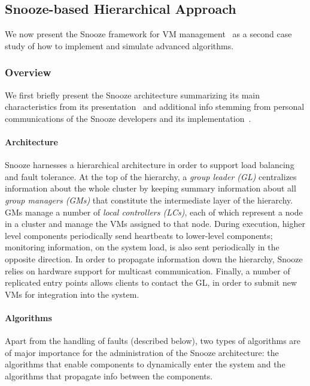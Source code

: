 \subsection{Snooze-based Hierarchical Approach}
\label{subsec:snooze}


We now present the Snooze framework for VM
management~\cite{feller:ccgrid12} as a second case study of how
to implement and simulate advanced algorithms.

\subsubsection{Overview}

We first briefly present the Snooze architecture summarizing its main
characteristics from its presentation~\cite{feller:ccgrid12} and
additional info stemming from personal communications of the Snooze
developers and its implementation~\cite{snoozedev14,snoozeweb}.

\paragraph{Architecture}

Snooze harnesses a hierarchical architecture in order to support load
balancing and fault tolerance. At the top of the hierarchy, a
\emph{group leader (GL)} centralizes information about the whole
cluster by keeping summary information about all \emph{group managers
  (GMs)} that constitute the intermediate layer of the hierarchy. GMs
manage a number of \emph{local controllers (LCs)}, each of which
represent a node in a cluster and manage the VMs assigned to that
node. During execution, higher level components periodically send
heartbeats to lower-level components; monitoring information, \eg on
the system load, is also sent periodically in the opposite
direction. In order to propagate information down the hierarchy,
Snooze relies on hardware support for multicast
communication. Finally, a number of replicated entry points allows
clients to contact the GL, \eg in order to submit new VMs for
integration into the system.

\paragraph{Algorithms}
\label{sec:snoozeAlgs}

Apart from the handling of faults (described below), two types of
algorithms are of major importance for the administration of the
Snooze architecture: the algorithms that enable components to
dynamically enter the system and the algorithms that propagate info
between the components.

